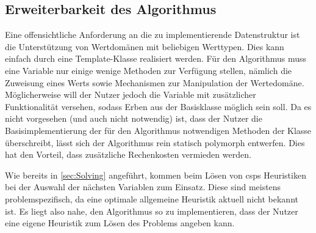 \subsection{Erweiterbarkeit des Algorithmus}
\label{sec:Extensions}
Eine offensichtliche Anforderung an die zu implementierende Datenstruktur  ist die Unterstützung von Wertdomänen mit beliebigen Werttypen. Dies kann einfach durch
eine Template-Klasse realisiert werden. Für den Algorithmus muss eine Variable nur einige wenige Methoden zur Verfügung stellen, nämlich die Zuweisung eines Werts sowie Mechanismen
zur Manipulation der Wertedomäne. Möglicherweise will der Nutzer jedoch die Variable mit zusätzlicher Funktionalität versehen, sodass Erben aus der Basisklasse 
möglich sein soll. Da es nicht vorgesehen (und auch nicht notwendig) ist, dass der Nutzer die Basisimplementierung der für den Algorithmus notwendigen Methoden der Klasse
 überschreibt, lässt sich der Algorithmus rein statisch polymorph entwerfen. Dies hat den Vorteil, dass zusätzliche Rechenkosten vermieden werden.

Wie bereits in \cref{sec:Solving} angeführt, kommen beim Lösen von \acp{csp} Heuristiken bei der Auswahl der nächsten Variablen zum Einsatz. Diese sind meistens problemspezifisch,
da eine optimale allgemeine Heuristik aktuell nicht bekannt ist. Es liegt also nahe, den Algorithmus so zu implementieren, dass der Nutzer eine eigene Heuristik zum Lösen des
Problems angeben kann.
